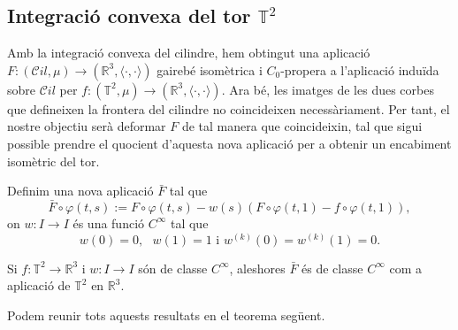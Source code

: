 \subsection{Integració convexa del tor $\mathbb T^2$}
Amb la integració convexa del cilindre, hem obtingut una aplicació $F:(\mathcal Cil, \mu)\to(\mathbb R^3, \langle\cdot, \cdot\rangle)$ gairebé isomètrica i $C_0$-propera a l'aplicació induïda sobre $\mathcal Cil$ per $f:(\mathbb T^2, \mu)\to(\mathbb R^3, \langle\cdot, \cdot\rangle)$. Ara bé, les imatges de les dues corbes que defineixen la frontera del cilindre no coincideixen necessàriament. Per tant, el nostre objectiu serà deformar $F$ de tal manera que coincideixin, tal que sigui possible prendre el quocient d'aquesta nova aplicació per a obtenir un encabiment isomètric del tor.

Definim una nova aplicació $\bar F$ tal que
\begin{equation}
    \label{eq:def_barF}
    \bar F\circ\varphi(t,s) := F\circ\varphi(t,s) - w(s)(F\circ\varphi(t,1)-f\circ\varphi(t,1)),
\end{equation}
on $w:I\to I$ és una funció $C^\infty$ tal que 
\begin{equation*}
    w(0)=0, \text{ } w(1)=1 \text{ i } w^{(k)}(0)=w^{(k)}(1)=0.
\end{equation*}
\begin{lema}
    \label{lema:lema8}
    Si $f:\mathbb T^2\to\mathbb R^3$ i $w:I\to I$ són de classe $C^\infty$, aleshores $\bar F$ és de classe $C^\infty$ com a aplicació de $\mathbb T^2$ en $\mathbb R^3$.
\end{lema}
Podem reunir tots aquests resultats en el teorema següent.
